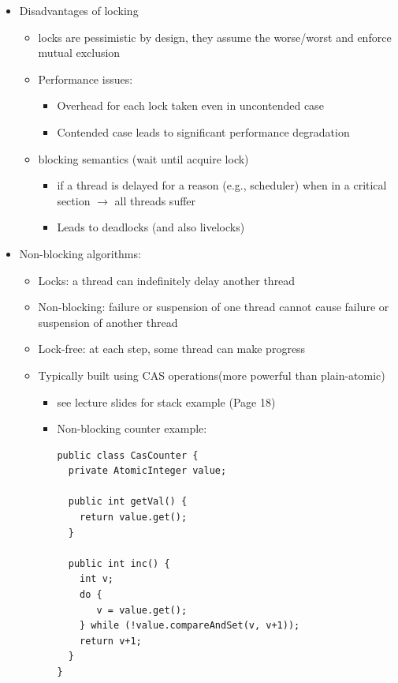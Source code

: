 \documentclass[a4paper]{article}
\begin{document}
\begin{itemize}
\item Disadvantages of locking
\begin{itemize}
\item locks are pessimistic by design, they assume the worse/worst and enforce mutual exclusion
\item Performance issues: 
\begin{itemize}
\item Overhead for each lock taken even in uncontended case
\item Contended case leads to significant performance degradation
\end{itemize}
\item blocking semantics (wait until acquire lock)
\begin{itemize}
\item  if a thread is delayed for a reason (e.g., scheduler) when in a critical section $\rightarrow$ all threads suffer
\item Leads to deadlocks (and also livelocks)
\end{itemize}
\end{itemize}
\item Non-blocking algorithms: 
\begin{itemize}
\item Locks: a thread can indefinitely delay another thread
\item Non-blocking: failure or suspension of one thread cannot cause failure or suspension of another thread
\item Lock-free: at each step, some thread can make progress 
\item Typically built using CAS operations(more powerful than plain-atomic)
\begin{itemize}
\item see lecture slides for stack example (Page 18)
\item Non-blocking counter example:
\begin{lstlisting}
public class CasCounter {
  private AtomicInteger value;

  public int getVal() {
    return value.get();
  }

  public int inc() {
    int v;
    do {
       v = value.get();
    } while (!value.compareAndSet(v, v+1));
    return v+1;
  }
}
\end{lstlisting}
\end{itemize}
\end{itemize}
\end{itemize}
\end{document}
